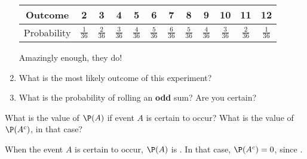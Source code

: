 \documentclass{ccg-topic}
\begin{document}
\begin{todo}
\begin{enumerate}
        	{\answer 
        		\begin{tabular}{c|c|c|c|c|c|c|c|c|c|c|c}
        		Outcome & 2 & 3 & 4 & 5 & 6 & 7 & 8 & 9 & 10 & 11 & 12 \\
        		\hline
        		Probability & $\frac{1}{36}$ & $\frac{2}{36}$ & $\frac{3}{36}$ & $\frac{4}{36}$ & $\frac{5}{36}$ & $\frac{6}{36}$ & $\frac{5}{36}$ & $\frac{4}{36}$ & $\frac{3}{36}$ & $\frac{2}{36}$ & $\frac{1}{36}$ \\
        		\end{tabular} 
        
        	Amazingly enough, they do! } 
        
            \item What is the most likely outcome of this experiment?
        
            {}
        
        	\item What is the probability of rolling an \textbf{odd} sum? Are you certain?
        
        	{}
        
        	\end{enumerate}
    \end{todo}
	
    \begin{todo}
        \label{todo:boolean_algebra}
        What is the value of $\P(A)$ if event $A$ is certain to occur?  What is the value of $\P(A^c)$, in that case? 
        
        When the event $A$ is certain to occur, $\P(A)$ is .  In that case, $\P(A^c) = 0$, since .
    \end{todo}
\end{document}
